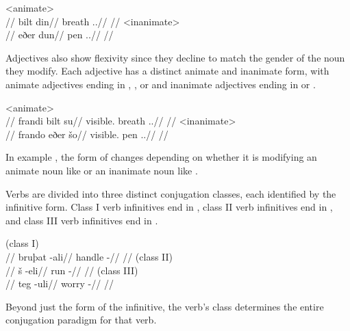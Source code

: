 	\a<animate>\begingl
		\glpreamble{}\\
		//
		\gla bilt din//
		\glb breath \An.\Pl.\Erg//
		\glft {}//
	\endgl
	\a<inanimate>\begingl
		\glpreamble{}\\
		//
		\gla eðer dun//
		\glb pen \In.\Pl.\Erg//
		\glft {}//
	\endgl
\xe

Adjectives also show flexivity since they decline to match the gender of the noun they modify. Each adjective has a distinct animate and inanimate form, with animate adjectives ending in , , or  and inanimate adjectives ending in  or .

	\a<animate>\begingl
		\glpreamble{}\\
		//
		\gla frandi bilt su//
		\glb visible.\An{} breath \An.\Sg.\Gen//
		\glft {}//
	\endgl
	\a<inanimate>\begingl
		\glpreamble{}\\
		//
		\gla frando eðer šo//
		\glb visible.\In{} pen \In.\Sg.\Gen//
		\glft {}//
	\endgl
\xe

In example , the form of  changes depending on whether it is modifying an animate noun like  or an inanimate noun like .

Verbs are divided into three distinct conjugation classes, each identified by the infinitive form. Class I verb infinitives end in , class II verb infinitives end in , and class III verb infinitives end in .

	\begingl
		\glpreamble{} (class I)\\
		//
		\gla bruþat -ali//
		\glb handle -\Inf//
		\glft {}//
	\endgl
	\a<cl2>\begingl
		\glpreamble{} (class II)\\
		//
		\gla š -eli//
		\glb run -\Inf//
		\glft {}//
	\endgl
	\a<cl3>\begingl
		\glpreamble{} (class III)\\
		//
		\gla teg -uli//
		\glb worry -\Inf//
		\glft {}//
	\endgl
\xe

Beyond just the form of the infinitive, the verb's class determines the entire conjugation paradigm for that verb.

